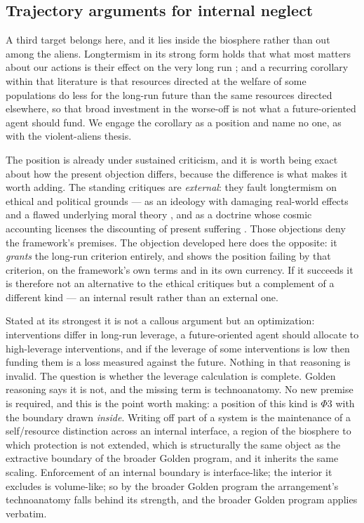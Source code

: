 \subsection{Trajectory arguments for internal neglect}
\label{gr:subsub:neglect}

A third target belongs here, and it lies inside the biosphere rather
than out among the aliens. Longtermism in its strong form holds that
what most matters about our actions is their effect on the very long
run \cite{GM21}; and a recurring corollary within that literature is
that resources directed at the welfare of some populations do less for
the long-run future than the same resources directed elsewhere, so that
broad investment in the worse-off is not what a future-oriented agent
should fund. We engage the corollary as a position and name no one, as
with the violent-aliens thesis.

The position is already under sustained criticism, and it is worth being
exact about how the present objection differs, because the difference is
what makes it worth adding. The standing critiques are \emph{external}:
they fault longtermism on ethical and political grounds --- as an
ideology with damaging real-world effects and a flawed underlying moral
theory \cite{Crary23}, and as a doctrine whose cosmic accounting
licenses the discounting of present suffering \cite{Torres21}. Those
objections deny the framework's premises. The objection developed here
does the opposite: it \emph{grants} the long-run criterion entirely, and
shows the position failing by that criterion, on the framework's own
terms and in its own currency. If it succeeds it is therefore not an
alternative to the ethical critiques but a complement of a different
kind --- an internal result rather than an external one.

Stated at its strongest it is not a callous argument but an
optimization: interventions differ in long-run leverage, a
future-oriented agent should allocate to high-leverage interventions,
and if the leverage of some interventions is low then funding them is a
loss measured against the future. Nothing in that reasoning is invalid.
The question is whether the leverage calculation is complete. Golden reasoning says it is not, and the missing term is technoanatomy.
No new premise is required, and this is the point worth making: a
position of this kind is $\Phi3$ with the boundary drawn \emph{inside}.
Writing off part of a system is the maintenance of a self/resource
distinction across an internal interface, a region of the biosphere
to which protection is not extended, which is structurally the same
object as the extractive boundary of the broader Golden program, and it
inherits the same scaling. Enforcement of an internal boundary is
interface-like; the interior it excludes is volume-like; so by
the broader Golden program the arrangement's technoanatomy falls behind its strength, and
the broader Golden program applies verbatim.

